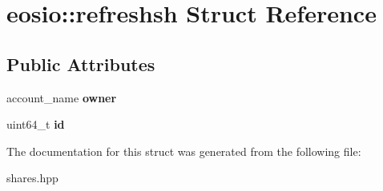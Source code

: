 \hypertarget{structeosio_1_1refreshsh}{}\section{eosio\+:\+:refreshsh Struct Reference}
\label{structeosio_1_1refreshsh}
\subsection*{Public Attributes}
\begin{DoxyCompactItemize}
\item 
\mbox{\label{structeosio_1_1refreshsh_aabb3cc8f7278e8cdb13d14fd99764297}} 
account\+\_\+name {\bfseries owner}
\item 
\mbox{\label{structeosio_1_1refreshsh_addc4e333881502bfb171b2e3b977e7b0}} 
uint64\+\_\+t {\bfseries id}
\end{DoxyCompactItemize}


The documentation for this struct was generated from the following file\+:\begin{DoxyCompactItemize}
\item 
shares.\+hpp\end{DoxyCompactItemize}
